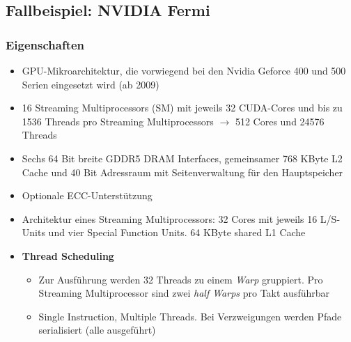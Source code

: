\subsection{Fallbeispiel: NVIDIA Fermi}

\subsubsection{Eigenschaften}
\begin{itemize}
	\item GPU-Mikroarchitektur, die vorwiegend bei den Nvidia Geforce 400 und 500 Serien eingesetzt wird (ab 2009)
	\item 16 Streaming Multiprocessors (SM) mit jeweils 32 CUDA-Cores und bis zu 1536 Threads pro Streaming Multiprocessors \(\rightarrow\) 512 Cores und 24576 Threads
	\item Sechs 64 Bit breite GDDR5 DRAM Interfaces, gemeinsamer 768 KByte L2 Cache und 40 Bit Adressraum mit Seitenverwaltung für den Hauptspeicher
	\item Optionale ECC-Unterstützung
	\item Architektur eines Streaming Multiprocessors: 32 Cores mit jeweils 16 L/S-Units und vier Special Function Units. 64 KByte shared L1 Cache
	\item \textbf{Thread Scheduling}
	\begin{itemize}
		\item Zur Ausführung werden 32 Threads zu einem \textit{Warp} gruppiert. Pro Streaming Multiprocessor sind zwei \textit{half Warps} pro Takt ausführbar
		\item Single Instruction, Multiple Threads. Bei Verzweigungen werden Pfade serialisiert (alle ausgeführt)
	\end{itemize}
\end{itemize}

